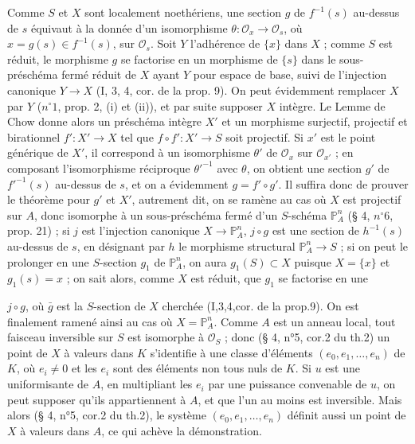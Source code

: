 Comme $S$ et $X$ sont localement noethériens, une section $g$ de $f^{-1}(s)$ au-dessus de $s$ équivaut à la donnée d'un isomorphisme $\theta : \mathcal{O}_x \to \mathcal{O}_s$, où $x = g(s) \in f^{-1}(s)$, sur $\mathcal{O}_s$. Soit $Y$ l'adhérence de $\{x\}$ dans $X$ ; comme $S$ est réduit, le morphisme $g$ se factorise en un morphisme de $\{s\}$ dans le sous-préschéma fermé réduit de $X$ ayant $Y$ pour espace de base, suivi de l'injection canonique $Y \to X$ (I, 3, 4, cor. de la prop. 9). On peut évidemment remplacer $X$ par $Y$ ($n^\circ 1$, prop. 2, (i) et (ii)), et par suite supposer $X$ intègre.
Le Lemme de Chow donne alors un préschéma intègre $X'$ et un morphisme surjectif, projectif et birationnel $f' : X' \to X$ tel que $f \circ f' : X' \to S$ soit projectif. Si $x'$ est le point générique de $X'$, il correspond à un isomorphisme $\theta'$ de $\mathcal{O}_x$ sur $\mathcal{O}_{x'}$ ; en composant l'isomorphisme réciproque $\theta'^{-1}$ avec $\theta$, on obtient une section $g'$ de $f'^{-1}(s)$ au-dessus de $s$, et on a évidemment $g = f' \circ g'$. Il suffira donc de prouver le théorème pour $g'$ et $X'$, autrement dit, on se ramène au cas où $X$ est projectif sur $A$, donc isomorphe à un sous-préschéma fermé d'un $S$-schéma $\mathbb{P}_A^n$ (§ 4, $n^\circ 6$, prop. 21) ; si $j$ est l'injection canonique $X \to \mathbb{P}_A^n$, $j \circ g$ est une section de $h^{-1}(s)$ au-dessus de $s$, en désignant par $h$ le morphisme structural $\mathbb{P}_A^n \to S$ ; si on peut le prolonger en une $S$-section $g_1$ de $\mathbb{P}_A^n$, on aura $g_1(S) \subset X$ puisque $X = \{x\}$ et $g_1(s) = x$ ; on sait alors, comme $X$ est réduit, que $g_1$ se factorise en une

\newpage


$j \circ g$, où $\bar{g}$ est la $S$-section de $X$ cherchée (I,3,4,cor. de la prop.9).
On est finalement ramené ainsi au cas où $X=\mathbb{P}^n_A$. Comme $A$ est un anneau local, tout faisceau inversible sur $S$ est isomorphe à $\mathcal{O}_S$ ; donc (§ 4, n°5, cor.2 du th.2) un point de $X$ à valeurs dans $K$ s'identifie à une classe d'éléments $(e_0, e_1, \dots, e_n)$ de $K$, où $e_i \neq 0$ et les $e_i$ sont des éléments non tous nuls de $K$. Si $u$ est une uniformisante de $A$, en multipliant les $e_i$ par une puissance convenable de $u$, on peut supposer qu'ils appartiennent à $A$, et que l'un au moins est inversible. Mais alors (§ 4, n°5, cor.2 du th.2), le système $(e_0, e_1, \dots, e_n)$ définit aussi un point de $X$ à valeurs dans $A$, ce qui achève la démonstration.


